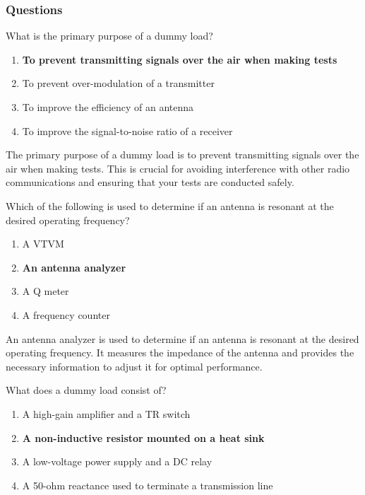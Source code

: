 \subsubsection{Questions}

\begin{tcolorbox}[colback=gray!10!white,colframe=black!75!black,title={T7C01}]
    What is the primary purpose of a dummy load?
    \begin{enumerate}[label=\Alph*),noitemsep]
        \item \textbf{To prevent transmitting signals over the air when making tests}
        \item To prevent over-modulation of a transmitter
        \item To improve the efficiency of an antenna
        \item To improve the signal-to-noise ratio of a receiver
    \end{enumerate}
\end{tcolorbox}

The primary purpose of a dummy load is to prevent transmitting signals over the air when making tests. This is crucial for avoiding interference with other radio communications and ensuring that your tests are conducted safely.

\begin{tcolorbox}[colback=gray!10!white,colframe=black!75!black,title={T7C02}]
    Which of the following is used to determine if an antenna is resonant at the desired operating frequency?
    \begin{enumerate}[label=\Alph*),noitemsep]
        \item A VTVM
        \item \textbf{An antenna analyzer}
        \item A Q meter
        \item A frequency counter
    \end{enumerate}
\end{tcolorbox}

An antenna analyzer is used to determine if an antenna is resonant at the desired operating frequency. It measures the impedance of the antenna and provides the necessary information to adjust it for optimal performance.

\begin{tcolorbox}[colback=gray!10!white,colframe=black!75!black,title={T7C03}]
    What does a dummy load consist of?
    \begin{enumerate}[label=\Alph*),noitemsep]
        \item A high-gain amplifier and a TR switch
        \item \textbf{A non-inductive resistor mounted on a heat sink}
        \item A low-voltage power supply and a DC relay
        \item A 50-ohm reactance used to terminate a transmission line
    \end{enumerate}
\end{tcolorbox}

